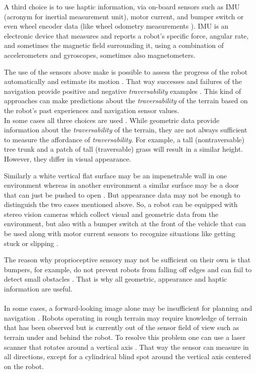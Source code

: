 \documentclass[12pt,a4paper]{report}
\newcommand{\term}{\textit}
\newcommand{\acronym}{\MakeUppercase}
\begin{document}
	A third choice is to use haptic information, via on-board sensors such as 
	\acronym{imu} (acronym for inertial measurement unit), motor current, and bumper 
	switch \cite{Kim} or even wheel encoder data \cite{Lee} (like wheel odometry 
	measurements \cite{Droeschel}). \acronym{imu} is an electronic device that 
	measures and reports a robot's specific force, angular rate, and sometimes the 
	magnetic field surrounding it, using a combination of accelerometers and 
	gyroscopes, sometimes also magnetometers. 
	\par
	The use of the sensors above make is possible to assess the progress of the 
	robot automatically and estimate its motion \cite{Droeschel}. That way successes 
	and failures of the navigation provide positive and negative \term{traversability} 
	examples \cite{Kim}. This kind of approaches can make predictions about the 
	\term{traversability} of the terrain based on the robot's past experiences and 
	navigation sensor values.
	\\
	
	In some cases all three choices are used \cite{Kim}. While geometric data 
	provide information about the \term{traversability} of the terrain, they are 
	not always sufficient to measure the affordance of \term{traversability}. For 
	example, a tall (nontraversable) tree trunk and a patch of tall (traversable) 
	grass will result in a similar height. However, they differ in visual 
	appearance. 
	\par 
	Similarly a white vertical flat surface may be an impenetrable wall in one 
	environment whereas in another environment a similar surface may be a door that 
	can just be pushed to open \cite{Ugur}. But appearance data may not be enough 
	to distinguish the two cases mentioned above. So, a robot can be equipped with 
	stereo vision cameras which collect visual and geometric data from the 
	environment, but also with a bumper switch at the front of the vehicle that can 
	be used along with motor current sensors to recognize situations like getting 
	stuck or slipping \cite{Kim}.
	\par
	The reason why proprioceptive sensory may not be sufficient on their own is that 
	bumpers, for example, do not prevent robots from falling off edges and can fail 
	to detect small obstacles \cite{HiroseGonet}. That is why all geometric, 
	appearance and haptic information are useful.
	\\\\
	
	
	In some cases, a forward-looking image alone may be insufficient for planning and 
	navigation \cite{Kweon}. Robots operating in rough terrain may require knowledge 
	of terrain that has been observed but is currently out of the sensor field of 
	view such as terrain under and behind the robot. To resolve this problem one can 
	use a laser scanner that rotates around a vertical axis \cite{Droeschel}. That 
	way the sensor can measure in all directions, except for a cylindrical blind spot 
	around the vertical axis centered on the robot.
	\\\\
	
\end{document}
